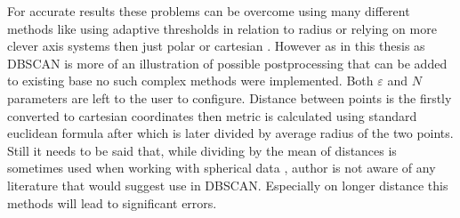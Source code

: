 For accurate results these problems can be overcome using many different methods like using adaptive thresholds in relation to radius \cite{Kellner2012} or relying on more clever axis systems then just polar or cartesian \cite{Sun2024}.
However as in this thesis as DBSCAN is more of an illustration of possible postprocessing that can be added to existing base no such complex methods were implemented.
Both $\varepsilon$ and $N$ parameters are left to the user to configure.
Distance between points is the firstly converted to cartesian coordinates then metric is calculated using standard euclidean formula after which is later divided by average radius of the two points.
Still it needs to be said that, while dividing by the mean of distances is sometimes used when working with spherical data \cite{Fisher1993}, author is not aware of any literature that would suggest use in DBSCAN.
Especially on longer distance this methods will lead to significant errors.










\listoffigures

\listoftables



\clearpage
\openright

